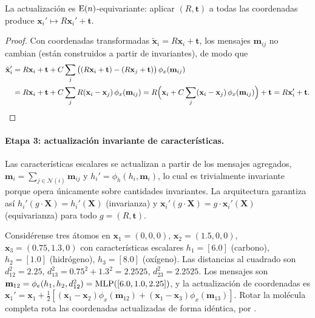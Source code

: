 \begin{proposition}
\label{prop:groups:egnn-equivariance}
La actualizaci\'on  es $\operatorname{E}(n)$-equivariante:
aplicar $(R, \mathbf{t})$ a todas las coordenadas produce $\mathbf{x}_i' \mapsto
R\mathbf{x}_i' + \mathbf{t}$.
\end{proposition}

\begin{proof}
Con coordenadas transformadas $\tilde{\mathbf{x}}_i = R\mathbf{x}_i +
\mathbf{t}$, los mensajes $\mathbf{m}_{ij}$ no cambian (est\'an construidos a
partir de invariantes), de modo que
\begin{align}
  \tilde{\mathbf{x}}_i'
  &= R\mathbf{x}_i + \mathbf{t} + C \sum_{j} \big((R\mathbf{x}_i + \mathbf{t})
     - (R\mathbf{x}_j + \mathbf{t})\big)\, \phi_x(\mathbf{m}_{ij}) \\
  &= R\mathbf{x}_i + \mathbf{t} + C \sum_{j} R(\mathbf{x}_i - \mathbf{x}_j)\,
     \phi_x(\mathbf{m}_{ij})
   = R\Big(\mathbf{x}_i + C \sum_{j} (\mathbf{x}_i - \mathbf{x}_j)\,
     \phi_x(\mathbf{m}_{ij})\Big) + \mathbf{t}
   = R\mathbf{x}_i' + \mathbf{t}. \qedhere
\end{align}
\end{proof}

\paragraph{Etapa 3: actualizaci\'on invariante de caracter\'isticas.}
Las caracter\'isticas escalares se actualizan a partir de los mensajes agregados,
$\mathbf{m}_i = \sum_{j \in \mathcal{N}(i)} \mathbf{m}_{ij}$ y $h_i' = \phi_h(h_i,
\mathbf{m}_i)$, lo cual es trivialmente invariante porque opera \'unicamente sobre
cantidades invariantes. La arquitectura garantiza as\'i $h_i'(g \cdot \mathbf{X})
= h_i'(\mathbf{X})$ (invarianza) y $\mathbf{x}_i'(g \cdot \mathbf{X}) = g \cdot
\mathbf{x}_i'(\mathbf{X})$ (equivarianza) para todo $g = (R, \mathbf{t})$.

\begin{example}
\label{ex:groups:egnn-molecular}
Consid\'erense tres \'atomos en $\mathbf{x}_1 = (0,0,0)$, $\mathbf{x}_2 =
(1.5,0,0)$, $\mathbf{x}_3 = (0.75, 1.3, 0)$ con caracter\'isticas escalares $h_1
= [6.0]$ (carbono), $h_2 = [1.0]$ (hidr\'ogeno), $h_3 = [8.0]$ (ox\'igeno). Las
distancias al cuadrado son $d_{12}^2 = 2.25$, $d_{13}^2 = 0.75^2 + 1.3^2 =
2.2525$, $d_{23}^2 = 2.2525$. Los mensajes son $\mathbf{m}_{12} = \phi_e(h_1,
h_2, d_{12}^2) = \operatorname{MLP}([6.0, 1.0, 2.25])$, y la actualizaci\'on de coordenadas es
$\mathbf{x}_1' = \mathbf{x}_1 + \tfrac{1}{2}[(\mathbf{x}_1 -
\mathbf{x}_2)\phi_x(\mathbf{m}_{12}) + (\mathbf{x}_1 -
\mathbf{x}_3)\phi_x(\mathbf{m}_{13})]$. Rotar la mol\'ecula completa rota las
coordenadas actualizadas de forma id\'entica, por
.
\end{example}

